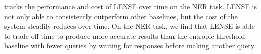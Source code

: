  tracks the performance and cost of LENSE over time on the NER task.
LENSE is not only able  to consistently outperform other baselines, but the cost of the system steadily reduces over time.
On the NER task, we find that LENSE is able to trade off time to produce more accurate results than the entropic threshold baseline with fewer queries by waiting for responses before making another query.




